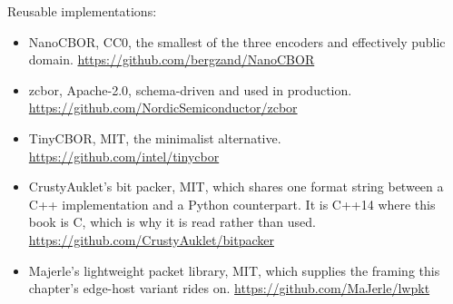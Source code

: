 Reusable implementations:
\begin{itemize}
\item NanoCBOR, CC0, the smallest of the three encoders and effectively public
domain.\newline
\url{https://github.com/bergzand/NanoCBOR}
\item zcbor, Apache-2.0, schema-driven and used in production.\newline
\url{https://github.com/NordicSemiconductor/zcbor}
\item TinyCBOR, MIT, the minimalist alternative.\newline
\url{https://github.com/intel/tinycbor}
\item CrustyAuklet's bit packer, MIT, which shares one format string between a
C++ implementation and a Python counterpart. It is C++14 where this book is C,
which is why it is read rather than used.\newline
\url{https://github.com/CrustyAuklet/bitpacker}
\item Majerle's lightweight packet library, MIT, which supplies the framing this
chapter's edge-host variant rides on.\newline
\url{https://github.com/MaJerle/lwpkt}
\end{itemize}
